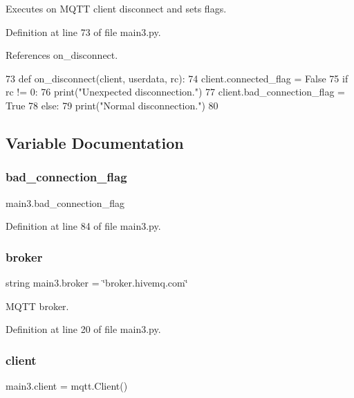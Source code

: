 Executes on M\+Q\+TT client disconnect and sets flags. 



Definition at line 73 of file main3.\+py.



References on\+\_\+disconnect.


\begin{DoxyCode}
73 \textcolor{keyword}{def }on_disconnect(client, userdata, rc):
74     client.connected\_flag = \textcolor{keyword}{False}
75     \textcolor{keywordflow}{if} rc != 0:
76         print(\textcolor{stringliteral}{"Unexpected disconnection."})
77         client.bad\_connection\_flag = \textcolor{keyword}{True}
78     \textcolor{keywordflow}{else}:
79         print(\textcolor{stringliteral}{"Normal disconnection."})
80 
\end{DoxyCode}


\subsection{Variable Documentation}
\mbox{\label{namespacemain3_ab4939f18edc72dec9e72dfa3ec2f026b}} 
\subsubsection{bad\+\_\+connection\+\_\+flag}
{\footnotesize\ttfamily main3.\+bad\+\_\+connection\+\_\+flag}



Definition at line 84 of file main3.\+py.

\mbox{\label{namespacemain3_afdf3bec321b3b9107003c09223640e80}} 
\subsubsection{broker}
{\footnotesize\ttfamily string main3.\+broker = \char`\"{}broker.\+hivemq.\+com\char`\"{}}



M\+Q\+TT broker. 



Definition at line 20 of file main3.\+py.

\mbox{\label{namespacemain3_ac22ae978a8b5a446c25462949448abe9}} 
\subsubsection{client}
{\footnotesize\ttfamily main3.\+client = mqtt.\+Client()}



